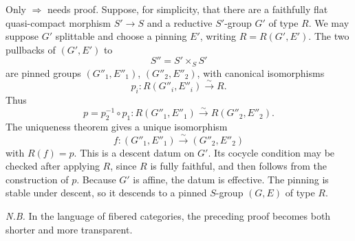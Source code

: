 
Only \(\Rightarrow\) needs proof. Suppose, for simplicity,
that there are a faithfully flat quasi-compact morphism \(S'\to S\)
and a reductive \(S'\)-group \(G'\) of type \(R\). We may suppose
\(G'\) splittable and choose a pinning \(E'\), writing
\(R=R(G',E')\). The two pullbacks of \((G',E')\) to
\[
  S''=S'\times_SS'
\]
are pinned groups \((G''_1,E''_1)\), \((G''_2,E''_2)\), with
canonical isomorphisms
\[
  p_i:R(G''_i,E''_i)\xrightarrow{\sim}R.
\]
Thus
\[
  p=p_2^{-1}\circ p_1:
  R(G''_1,E''_1)\xrightarrow{\sim}R(G''_2,E''_2).
\]
The uniqueness theorem gives a unique isomorphism
\[
  f:(G''_1,E''_1)\xrightarrow{\sim}(G''_2,E''_2)
\]
with \(R(f)=p\). This is a descent datum on \(G'\). Its cocycle
condition may be checked after applying \(R\), since \(R\) is fully
faithful, and then follows from the construction of \(p\). Because
\(G'\) is affine, the datum is effective. The pinning is stable
under descent, so it descends to a pinned \(S\)-group \((G,E)\) of
type \(R\).

\medskip
\noindent\textit{N.B.}\quad
In the language of fibered categories, the preceding proof becomes
both shorter and more transparent.



